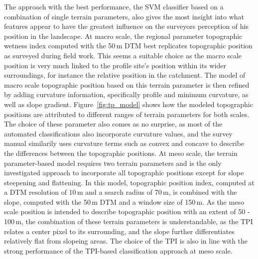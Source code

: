 \documentclass[preprint,12pt,authoryear]{elsarticle}
\begin{document}
The approach with the best performance, the SVM classifier based on a combination of single terrain parameters, also gives the most insight into what features appear to have the greatest influence on the surveyors perception of his position in the landscape. At macro scale, the regional parameter topographic wetness index computed with the 50\,m DTM best replicates topographic position as surveyed during field work. This seems a suitable choice as the macro scale position is very much linked to the profile site's position within its wider surroundings, for instance the relative position in the catchment. The model of macro scale topographic position based on this terrain parameter is then refined by adding curvature information, specifically profile and minimum curvature, as well as slope gradient. Figure~\ref{fig:tp_model} shows how the modeled topographic positions are attributed to different ranges of terrain parameters for both scales. The choice of these parameter also comes as no surprise, as most of the automated classifications also incorporate curvature values, and the survey manual similarily uses curvature terms such as convex and concave to describe the differences between the topographic positions. At meso scale, the terrain parameter-based model requires two terrain parameters and is the only investigated approach to incorporate all topographic positions except for slope steepening and flattening. In this model, topographic position index, computed at a DTM resolution of 10\,m and a search radius of 70\,m, is combined with the slope, computed with the 50\,m DTM and a window size of 150\,m. As the meso scale position is intended to describe topographic position with an extent of 50 - 100\,m, the combination of these terrain parameters is understandable, as the TPI relates a center pixel to its surrounding, and the slope further differentiates relatively flat from slopeing areas. The choice of the TPI is also in line with the strong performance of the TPI-based classification approach at meso scale.
\end{document}
